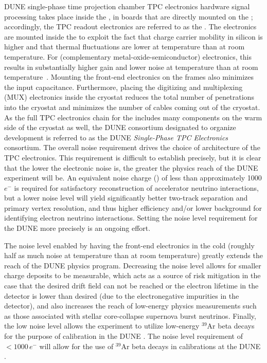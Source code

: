 DUNE single-phase time projection chamber TPC electronics hardware signal processing takes place inside the \lar, in boards that are directly mounted on the ; accordingly, the TPC readout electronics are referred to as the .  The electronics are mounted inside the \lar to exploit the fact that charge carrier mobility in silicon is higher and that thermal fluctuations are lower at \lar temperature than at room temperature.  For  (complementary metal-oxide-semiconductor) electronics, this results in substantially higher gain and lower noise at \lar temperature than at room temperature~\cite{larCMOS}.  Mounting the front-end electronics on the  frames also minimizes the input capacitance.  Furthermore, placing the digitizing and multiplexing (MUX) electronics inside the cryostat reduces the total number of penetrations into the cryostat and minimizes the number of cables coming out of the cryostat.  As the full TPC electronics chain for the  includes many components on the warm side of the cryostat as well, the DUNE consortium designated to organize  development is referred to as the DUNE \textit{Single-Phase TPC Electronics} consortium.
The overall noise requirement drives the choice of architecture of the TPC electronics. This requirement is difficult to establish precisely, but it is clear that the lower the electronic noise is, the greater the physics reach of the DUNE experiment will be.  An equivalent noise charge () of less than approximately 1000$e^-$ is required for satisfactory reconstruction of accelerator neutrino interactions, but a lower noise level will yield significantly better two-track separation and primary vertex resolution, and thus higher efficiency and/or lower background for identifying electron neutrino interactions.  Setting the noise level requirement for the DUNE  more precisely is an ongoing effort.

The noise level enabled by having the front-end electronics in the cold (roughly half as much noise at \lar temperature than at room temperature) greatly extends the reach of the DUNE physics program.  Decreasing the noise level allows for smaller charge deposits to be measurable, which acts as a source of risk mitigation in the case that the desired drift field can not be reached or the electron lifetime in the detector is lower than desired (due to the electronegative impurities in the detector), and also increases the reach of low-energy physics measurements such as those associated with stellar core-collapse supernova burst neutrinos.  Finally, the low noise level allows the experiment to utilize low-energy $\mathrm{{}^{39}Ar}$ beta decays for the purpose of calibration in the DUNE .  The noise level requirement of \,$<\num{1000}\,e^-$ will allow for the use of $\mathrm{{}^{39}Ar}$ beta decays in calibrations at the DUNE .

